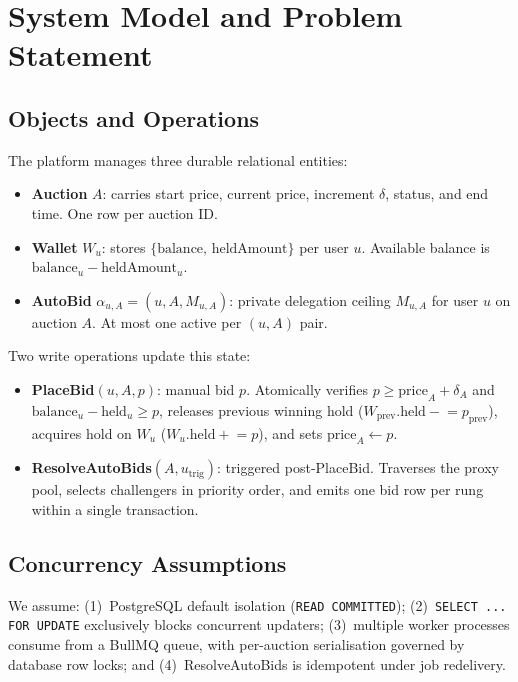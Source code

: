\documentclass[conference]{IEEEtran}
\begin{document}
\section{System Model and Problem Statement}

\subsection{Objects and Operations}
The platform manages three durable relational entities:
\begin{itemize}
  \item \textbf{Auction} $A$: carries start price, current price, increment $\delta$,
    status, and end time. One row per auction ID.
  \item \textbf{Wallet} $W_u$: stores $\{\text{balance},\,\text{heldAmount}\}$ per user $u$.
    Available balance is $\text{balance}_u - \text{heldAmount}_u$.
  \item \textbf{AutoBid} $\alpha_{u,A} = (u, A, M_{u,A})$: private delegation ceiling
    $M_{u,A}$ for user $u$ on auction $A$. At most one active per $(u,A)$ pair.
\end{itemize}

Two write operations update this state:
\begin{itemize}
  \item \textbf{PlaceBid}$(u, A, p)$: manual bid $p$. Atomically verifies $p \geq \text{price}_A + \delta_A$
    and $\text{balance}_u - \text{held}_u \geq p$, releases previous winning hold
    ($W_{\text{prev}}.\text{held} \mathrel{-}= p_{\text{prev}}$), acquires hold on $W_u$
    ($W_u.\text{held} \mathrel{+}= p$), and sets $\text{price}_A \leftarrow p$.
  \item \textbf{ResolveAutoBids}$(A, u_{\text{trig}})$: triggered post-PlaceBid. Traverses
    the proxy pool, selects challengers in priority order, and emits one bid row per rung
    within a single transaction.
\end{itemize}

\subsection{Concurrency Assumptions}
We assume: (1)~PostgreSQL default isolation (\texttt{READ COMMITTED}); (2)~\texttt{SELECT ... FOR UPDATE}
exclusively blocks concurrent updaters; (3)~multiple worker processes consume from a BullMQ queue,
with per-auction serialisation governed by database row locks; and (4)~ResolveAutoBids is idempotent
under job redelivery.
\end{document}
